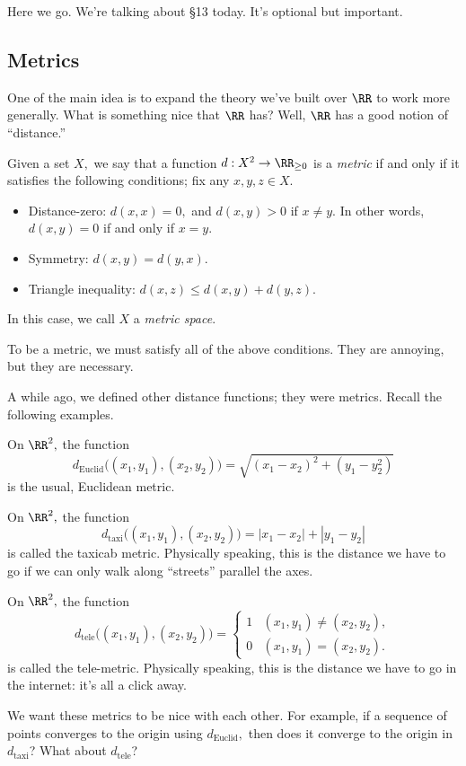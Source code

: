 
















Here we go. We're talking about \S13 today. It's optional but important.

\subsection{Metrics}
One of the main idea is to expand the theory we've built over $\RR$ to work more generally. What is something nice that $\RR$ has? Well, $\RR$ has a good notion of ``distance.''
\begin{definition}
	Given a set $X,$ we say that a function $d:X^2\to\RR_{\ge0}$ is a \textit{metric} if and only if it satisfies the following conditions; fix any $x,y,z\in X.$
	\begin{itemize}
		\item Distance-zero: $d(x,x)=0,$ and $d(x,y)>0$ if $x\ne y.$ In other words, $d(x,y)=0$ if and only if $x=y.$
		\item Symmetry: $d(x,y)=d(y,x).$
		\item Triangle inequality: $d(x,z)\le d(x,y)+d(y,z).$
	\end{itemize}
	In this case, we call $X$ a \textit{metric space}.
\end{definition}
\begin{warn}
	To be a metric, we must satisfy all of the above conditions. They are annoying, but they are necessary.
\end{warn}
A while ago, we defined other distance functions; they were metrics. Recall the following examples.
\begin{example}
	On $\RR^2,$ the function
	\[d_{\text{Euclid}}\big((x_1,y_1),(x_2,y_2)\big)=\sqrt{(x_1-x_2)^2+(y_1-y_2^2)}\]
	is the usual, Euclidean metric.
\end{example}
\begin{example}
	On $\RR^2,$ the function
	\[d_{\text{taxi}}\big((x_1,y_1),(x_2,y_2)\big)=|x_1-x_2|+|y_1-y_2|\]
	is called the taxicab metric. Physically speaking, this is the distance we have to go if we can only walk along ``streets'' parallel the axes.
\end{example}
\begin{example}
	On $\RR^2,$ the function
	\[d_{\text{tele}}\big((x_1,y_1),(x_2,y_2)\big)=\begin{cases}
		1 & (x_1,y_1)\ne(x_2,y_2), \\
		0 & (x_1,y_1)=(x_2,y_2).
	\end{cases}\]
	is called the tele-metric. Physically speaking, this is the distance we have to go in the internet: it's all a click away.
\end{example}
We want these metrics to be nice with each other. For example, if a sequence of points converges to the origin using $d_{\text{Euclid}},$ then does it converge to the origin in $d_{\text{taxi}}$? What about $d_{\text{tele}}$?

